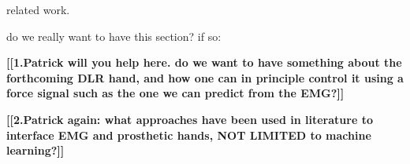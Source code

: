 related work.

do we really want to have this section? if so:

\textbf{[[1.Patrick will you help here. do we want to have something
about the forthcoming DLR hand, and how one can in principle control
it using a force signal such as the one we can predict from the EMG?]]}

\textbf{[[2.Patrick again: what approaches have been used in
literature to interface EMG and prosthetic hands, NOT LIMITED to
machine learning?]]}


